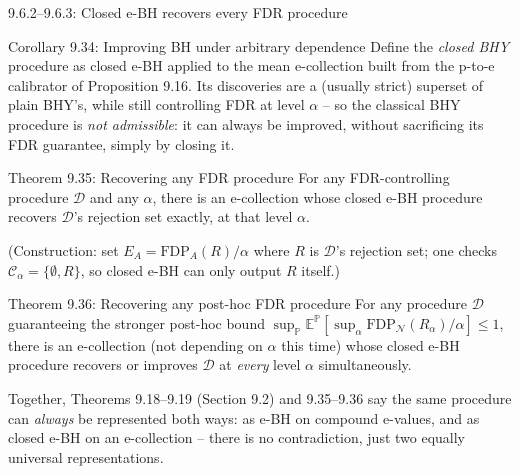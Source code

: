 \documentclass[aspectratio=169,10pt]{beamer}
\newcommand{\Nc}{\mathcal{N}}
\begin{document}
\begin{frame}[allowframebreaks]{9.6.2--9.6.3: Closed e-BH recovers every FDR procedure}

\begin{block}{Corollary 9.34: Improving BH under arbitrary dependence}
Define the \emph{closed BHY} procedure as closed e-BH applied to the mean e-collection built from the p-to-e calibrator of Proposition 9.16. Its discoveries are a (usually strict) superset of plain BHY's, while still controlling FDR at level $\alpha$ -- so the classical BHY procedure is \emph{not admissible}: it can always be improved, without sacrificing its FDR guarantee, simply by closing it.
\end{block}

\begin{block}{Theorem 9.35: Recovering any FDR procedure}
For any FDR-controlling procedure $\mathcal{D}$ and any $\alpha$, there is an e-collection whose closed e-BH procedure recovers $\mathcal{D}$'s rejection set exactly, at that level $\alpha$.
\end{block}
(Construction: set $E_A = \text{FDP}_A(R)/\alpha$ where $R$ is $\mathcal{D}$'s rejection set; one checks $\mathcal{C}_\alpha=\{\emptyset, R\}$, so closed e-BH can only output $R$ itself.)

\begin{block}{Theorem 9.36: Recovering any post-hoc FDR procedure}
For any procedure $\mathcal{D}$ guaranteeing the stronger post-hoc bound $\sup_{\mathbb{P}}\mathbb{E}^{\mathbb{P}}[\sup_\alpha \text{FDP}_{\Nc}(R_\alpha)/\alpha]\le1$, there is an e-collection (not depending on $\alpha$ this time) whose closed e-BH procedure recovers or improves $\mathcal{D}$ at \emph{every} level $\alpha$ simultaneously.
\end{block}
Together, Theorems 9.18--9.19 (Section 9.2) and 9.35--9.36 say the same procedure can \emph{always} be represented both ways: as e-BH on compound e-values, and as closed e-BH on an e-collection -- there is no contradiction, just two equally universal representations.

\end{frame}
\end{document}
